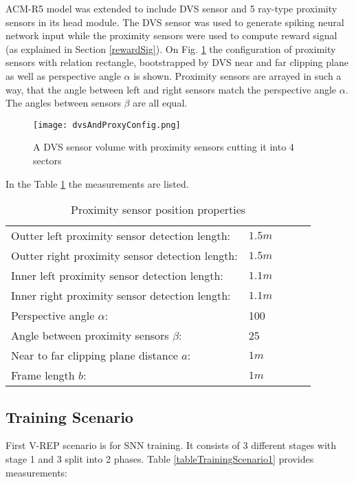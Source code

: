 ACM-R5 model was extended to include DVS sensor and 5 ray-type proximity sensors in its head module. The DVS sensor was used to generate spiking neural network input while the proximity sensors were used to compute reward signal (as explained in Section \ref{rewardSig}). On Fig. \ref{fig:dvsProxyConfig} the configuration of proximity sensors with relation rectangle, bootstrapped by DVS near and far clipping plane as well as perspective angle \(\alpha\) is shown. Proximity sensors are arrayed in such a way, that the angle between left and right sensors match the perspective angle \(\alpha\). The angles between sensors \(\beta\) are all equal. 
\begin{figure}[h]
	\begin{center}
		\texttt{[image: dvsAndProxyConfig.png]}
		\caption{A DVS sensor volume with proximity sensors cutting it into 4 sectors\label{fig:dvsProxyConfig}}  
	\end{center}
\end{figure}

In the Table \ref{tableDVSProxySpecs} the measurements are listed.

\begin{table}[h]
	\centering
	\caption{Proximity sensor position properties}
	\begin{tabular}{lllll}
		\cline{1-2}
		 Outter left proximity sensor detection length:&  \(1.5 m\)&  \\ 
		 Outter right proximity sensor detection length:&  \(1.5 m\)&  \\
		 Inner left proximity sensor detection length:&  \(1.1 m\)&  \\
		 Inner right proximity sensor detection length:&  \(1.1 m\)&  \\ 
		 Perspective angle \(\alpha\):&    100\degree& \\ 
		 Angle between proximity sensors \(\beta\):& 25\degree& \\ 
		 Near to far clipping plane distance \(a\):& \(1 m\)&\\ 
		 Frame length \(b\):& \(1 m\)&\\ \cline{1-2}
	\end{tabular}
\label{tableDVSProxySpecs}
\end{table}

\subsection{Training Scenario}

First V-REP scenario is for SNN training. It consists of 3 different stages with stage 1 and 3 split into 2 phases. Table \ref{tableTrainingScenario1} provides measurements:

